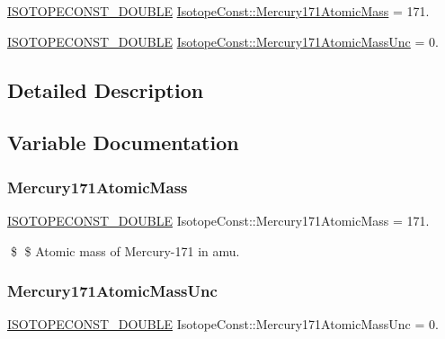 \begin{DoxyCompactItemize}
\item 
\mbox{\hyperlink{group___isotope_const-_macros_ga8f45a7272ce02c0b4c65c44636ed719a}{I\+S\+O\+T\+O\+P\+E\+C\+O\+N\+S\+T\+\_\+\+D\+O\+U\+B\+LE}} \mbox{\hyperlink{group___isotope_const-_mercury-_hg171_gac6266b001233541a7b7a56c1ddc12bea}{Isotope\+Const\+::\+Mercury171\+Atomic\+Mass}} = 171.
\item 
\mbox{\hyperlink{group___isotope_const-_macros_ga8f45a7272ce02c0b4c65c44636ed719a}{I\+S\+O\+T\+O\+P\+E\+C\+O\+N\+S\+T\+\_\+\+D\+O\+U\+B\+LE}} \mbox{\hyperlink{group___isotope_const-_mercury-_hg171_ga1b0c2f08737056515aab6c3f1c176414}{Isotope\+Const\+::\+Mercury171\+Atomic\+Mass\+Unc}} = 0.
\end{DoxyCompactItemize}


\subsection{Detailed Description}


\subsection{Variable Documentation}
\mbox{\label{group___isotope_const-_mercury-_hg171_gac6266b001233541a7b7a56c1ddc12bea}} 
\subsubsection{\texorpdfstring{Mercury171\+Atomic\+Mass}{Mercury171AtomicMass}}
{\footnotesize\ttfamily \mbox{\hyperlink{group___isotope_const-_macros_ga8f45a7272ce02c0b4c65c44636ed719a}{I\+S\+O\+T\+O\+P\+E\+C\+O\+N\+S\+T\+\_\+\+D\+O\+U\+B\+LE}} Isotope\+Const\+::\+Mercury171\+Atomic\+Mass = 171.}

\$ \$ Atomic mass of Mercury-\/171 in amu. \mbox{\label{group___isotope_const-_mercury-_hg171_ga1b0c2f08737056515aab6c3f1c176414}} 
\subsubsection{\texorpdfstring{Mercury171\+Atomic\+Mass\+Unc}{Mercury171AtomicMassUnc}}
{\footnotesize\ttfamily \mbox{\hyperlink{group___isotope_const-_macros_ga8f45a7272ce02c0b4c65c44636ed719a}{I\+S\+O\+T\+O\+P\+E\+C\+O\+N\+S\+T\+\_\+\+D\+O\+U\+B\+LE}} Isotope\+Const\+::\+Mercury171\+Atomic\+Mass\+Unc = 0.}

